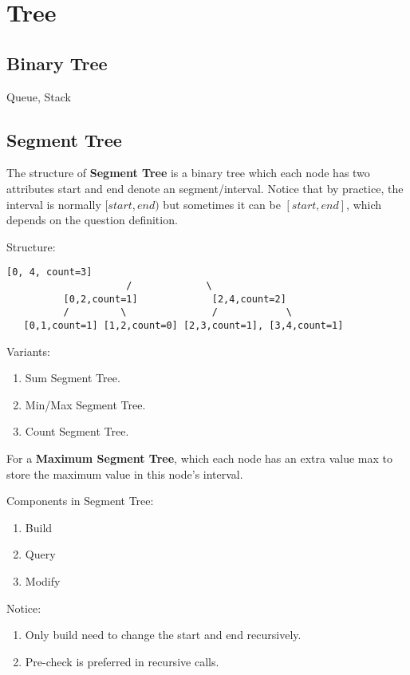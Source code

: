 \chapter{Tree}


\section{Binary Tree}
Queue, Stack

\section{Segment Tree}
The structure of \textbf{Segment Tree} is a binary tree which each node has two attributes start and end denote an segment/interval. Notice that by practice, the interval is normally $[start, end)$ but sometimes it can be $[start, end]$, which depends on the question definition. 

Structure:  
\begin{lstlisting}[columns=flexible]
                     [0, 4, count=3]
                     /             \
          [0,2,count=1]             [2,4,count=2]
          /         \               /            \
   [0,1,count=1] [1,2,count=0] [2,3,count=1], [3,4,count=1]
\end{lstlisting}

Variants:
\begin{enumerate}
\item Sum Segment Tree.
\item Min/Max Segment Tree.
\item Count Segment Tree. 
\end{enumerate}

For a \textbf{Maximum Segment Tree}, which each node has an extra value max
to store the maximum value in this node's interval.

Components in Segment Tree:
\begin{enumerate}
\item Build
\item Query 
\item Modify 
\end{enumerate}

Notice:
\begin{enumerate}
\item Only build need to change the start and end recursively.
\item Pre-check is preferred in recursive calls.
\end{enumerate}


